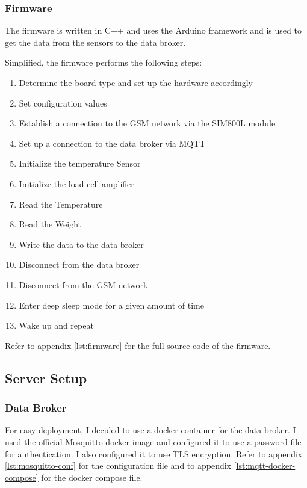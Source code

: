 \newpage
\subsubsection {Firmware} \label{sec:firmware}
The firmware is written in C++ and uses the Arduino framework and is used to get the data from the sensors to the data broker.

Simplified, the firmware performs the following steps:

\begin{enumerate}
    \item Determine the board type and set up the hardware accordingly
    \item Set configuration values
    \item Establish a connection to the GSM network via the SIM800L module
    \item Set up a connection to the data broker via MQTT
    \item Initialize the temperature Sensor
    \item Initialize the load cell amplifier
    \item Read the Temperature
    \item Read the Weight
    \item Write the data to the data broker
    \item Disconnect from the data broker
    \item Disconnect from the GSM network
    \item Enter deep sleep mode for a given amount of time
    \item Wake up and repeat
\end{enumerate}

Refer to appendix \ref{lst:firmware} for the full source code of the firmware.

\subsection{Server Setup}
\subsubsection {Data Broker} \label{sec:data_broker}
For easy deployment, I decided to use a docker container for the data broker. I used the official Mosquitto docker image and configured it to use a password file for authentication. I also configured it to use TLS encryption. Refer to appendix \ref{lst:mosquitto-conf} for the configuration file and to appendix \ref{lst:mqtt-docker-compose} for the docker compose file.

